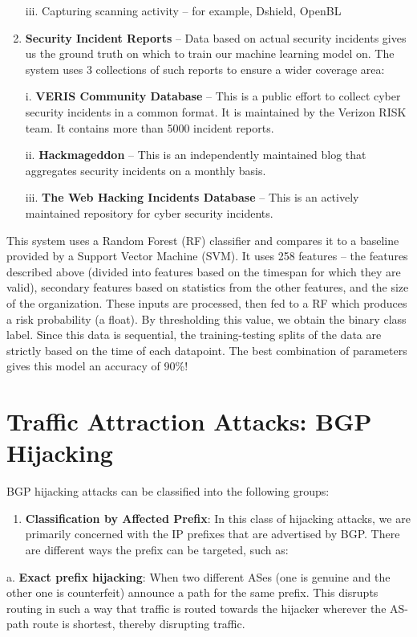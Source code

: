 \documentclass[11pt]{article}
\begin{document}
\begin{enumerate}
iii. Capturing scanning activity – for example, Dshield, OpenBL

\item \textbf{Security Incident Reports} – Data based on actual security incidents gives us the ground truth on which to train our machine learning model on. The system uses 3 collections of such reports to ensure a wider coverage area:

i. \textbf{VERIS Community Database} – This is a public effort to collect cyber security incidents in a common format. It is maintained by the Verizon RISK team. It contains more than 5000 incident reports.

ii. \textbf{Hackmageddon} – This is an independently maintained blog that aggregates security incidents on a monthly basis.

iii. \textbf{The Web Hacking Incidents Database} – This is an actively maintained repository for cyber security incidents.
\end{enumerate}

This system uses a Random Forest (RF) classifier and compares it to a baseline provided by a Support Vector Machine (SVM). It uses 258 features – the features described above (divided into features based on the timespan for which they are valid), secondary features based on statistics from the other features, and the size of the organization. These inputs are processed, then fed to a RF which produces a risk probability (a float). By thresholding this value, we obtain the binary class label. Since this data is sequential, the training-testing splits of the data are strictly based on the time of each datapoint. The best combination of parameters gives this model an accuracy of 90\%!

\section{Traffic Attraction Attacks: BGP Hijacking}
\label{sec:orgf272998}

BGP hijacking attacks can be classified into the following groups:

\begin{enumerate}
\item \textbf{Classification by Affected Prefix}: In this class of hijacking attacks, we are primarily concerned with the IP prefixes that are advertised by BGP. There are different ways the prefix can be targeted, such as:
\end{enumerate}

a. \textbf{Exact prefix hijacking}: When two different ASes (one is genuine and the other one is counterfeit) announce a path for the same prefix. This disrupts routing in such a way that traffic is routed towards the hijacker wherever the AS-path route is shortest, thereby disrupting traffic.
\end{document}
